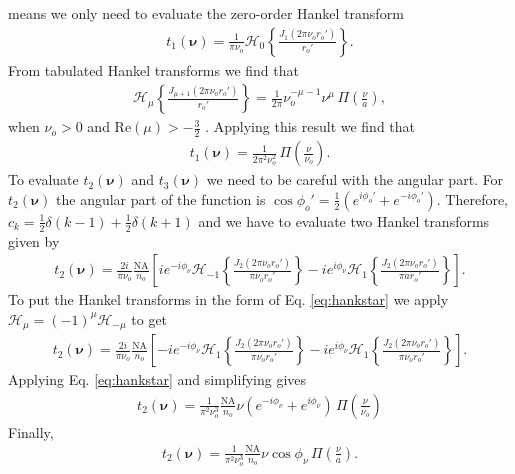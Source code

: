 \documentclass[11pt]{article}
\providecommand{\bs}[1]{\boldsymbol{#1}}
\begin{document}
means we only need to evaluate the zero-order Hankel transform
\begin{align}
  t_1(\bs{\nu}) = \frac{1}{\pi \nu_o}\mathcal{H}_0\left\{\frac{J_1(2\pi \nu_or_o')}{r_o'}\right\}.
\end{align}
From tabulated Hankel transforms we find that
\begin{align}
  \mathcal{H}_{\mu}\left\{\frac{J_{\mu+1}(2\pi \nu_or_o')}{r_o'}\right\} =
  \frac{1}{2\pi}\nu_o^{-\mu-1}\nu^\mu\, \Pi\left(\frac{\nu}{a}\right)\label{eq:hankstar},
\end{align}
when $\nu_o > 0$ and $\text{Re}(\mu) > -\frac{3}{2}$ \cite{poul1998}. Applying this result
we find that
\begin{align}
  t_1(\bs{\nu}) =
    \frac{1}{2\pi^2 \nu_o^{2}}\, \Pi\left(\frac{\nu}{\nu_o}\right)\label{eq:t1final}.
\end{align}
To evaluate $t_2(\bs{\nu})$ and $t_3(\bs{\nu})$ we need to be careful with the angular part. For $t_2(\bs{\nu})$
the angular part of the function is $\cos\phi_o' = \frac{1}{2}\left(e^{i\phi_o'} + e^{-i\phi_o'}\right)$. Therefore, $c_k = \frac{1}{2}\delta(k-1) + \frac{1}{2}\delta(k+1)$ and we have to evaluate two Hankel transforms given by
\begin{align}
  t_2(\bs{\nu}) = \frac{2i}{\pi \nu_o}\frac{\text{NA}}{n_o}\left[ie^{-i\phi_{\nu}}\mathcal{H}_{-1}\left\{\frac{J_2(2\pi \nu_or_o')}{\pi \nu_or_o'}\right\} - ie^{i\phi_{\nu}}\mathcal{H}_{1}\left\{\frac{J_2(2\pi \nu_or_o')}{\pi ar_o'}\right\}\right].
\end{align}
To put the Hankel transforms in the form of Eq. \ref{eq:hankstar} we apply
$\mathcal{H}_\mu = (-1)^\mu\mathcal{H}_{-\mu}$ to get
\begin{align}
  t_2(\bs{\nu}) = \frac{2i}{\pi \nu_o}\frac{\text{NA}}{n_o}\left[-ie^{-i\phi_{\nu}}\mathcal{H}_{1}\left\{\frac{J_2(2\pi \nu_or_o')}{\pi \nu_or_o'}\right\} - ie^{i\phi_{\nu}}\mathcal{H}_{1}\left\{\frac{J_2(2\pi \nu_or_o')}{\pi \nu_or_o'}\right\}\right].
\end{align}
Applying Eq. \ref{eq:hankstar} and simplifying gives
\begin{align}
  t_2(\bs{\nu}) =
    \frac{1}{\pi^2 \nu_o^3}\frac{\text{NA}}{n_o}\nu(e^{-i\phi_\nu} + e^{i\phi_\nu})\, \Pi\left(\frac{\nu}{\nu_o}\right)
\end{align}
Finally,
\begin{align}
  t_2(\bs{\nu}) =
    \frac{1}{\pi^2 \nu_o^3}\frac{\text{NA}}{n_o}\nu\cos\phi_{\nu}\, \Pi\left(\frac{\nu}{a}\right)\label{eq:t2final}.
\end{align}
\end{document}
